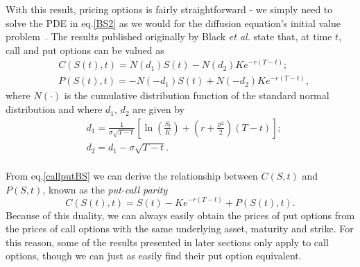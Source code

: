 With this result, pricing options is fairly straightforward - we simply need to solve the PDE in eq.\eqref{BS2} as we would for the diffusion equation's initial value problem~\cite{Dilao}.
The results published originally by Black \textit{et al.} state that, at time $t$, call and put options can be valued as
\begin{equation}\label{callputBS}
\begin{split}
&C(S(t),t)=N(d_1)S(t)-N(d_2)Ke^{-r(T-t)};\\
&P(S(t),t)=-N(-d_1)S(t)+N(-d_2)Ke^{-r(T-t)},
\end{split}
\end{equation}
\noindent where $N(\cdot)$ is the cumulative distribution function of the standard normal distribution and where $d_1$, $d_2$ are given by
\begin{equation}\label{d1d2}
\begin{split}
&d_1=\frac{1}{\sigma\sqrt{T-t}}\left[\ln\left(\frac{S_t}{K}\right)+\left(r+\frac{\sigma^2}{2}\right)(T - t)\right];\\
&d_2=d_1-\sigma\sqrt{T-t}.\\
\end{split}
\end{equation}



From eq.\eqref{callputBS} we can derive the relationship between $C(S,t)$ and $P(S,t)$, known as the \emph{put-call parity}
\begin{equation}
C(S(t),t)=S(t)-Ke^{-r(T-t)}+P(S(t),t).
\end{equation}
\noindent Because of this duality, we can always easily obtain the prices of put options from the prices of call options with the same underlying asset, maturity and strike. For this reason, some of the results presented in later sections only apply to call options, though we can just as easily find their put option equivalent.

